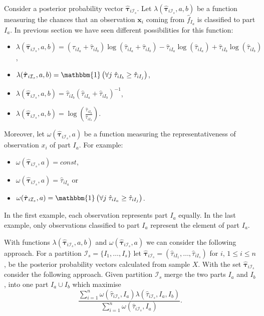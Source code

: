 \documentclass[10pt, a4paper]{article}
\newcommand{\m}[1]{\boldsymbol{#1}}
\begin{document}
Consider a posterior probability vector $\hat{\m \tau}_{i \mathcal{I}_s}$. Let $\lambda(\hat{\m \tau}_{i \mathcal{I}_s}, a, b)$  be a function measuring the chances that an observation $\m x_i$ coming from $\hat{f}_{I_a}$ is classified to part $I_a$. In previous section we have seen different possibilities for this function:
\begin{itemize}
\item $\lambda(\hat{\m \tau}_{i \mathcal{I}_s}, a, b) = (\hat{\tau}_{iI_a}+\hat{\tau}_{iI_b}) \log(\hat{\tau}_{iI_a} + \hat{\tau}_{iI_b}) - \hat{\tau}_{iI_a} \log(\hat{\tau}_{iI_a}) + \hat{\tau}_{iI_b} \log(\hat{\tau}_{iI_b})$,
\item $\lambda(\hat{\m \tau}_{i \mathcal{I}_s}, a, b) =\mathbbm{1}\left( \forall j\; \hat{\tau}_{i I_{b}} \geq \hat{\tau}_{iI_j} \right)$, 
\item $\lambda(\hat{\m \tau}_{i \mathcal{I}_s}, a, b) =\hat{\tau}_{iI_b}(\hat{\tau}_{iI_a} + \hat{\tau}_{iI_b})^{-1}$, 
\item $\lambda(\hat{\m \tau}_{i \mathcal{I}_s}, a, b) =\log( \frac{ \hat{\tau}_{iI_b} }{ \hat{\tau}_{iI_a} })$.
\end{itemize}
Moreover, let $\omega(\hat{\m \tau}_{i \mathcal{I}_s}, a)$ be a function measuring the representativeness of observation $x_i$ of part $I_a$. For example:
\begin{itemize}
\item $\omega(\hat{\m \tau}_{i \mathcal{I}_s}, a) = const$,
\item $\omega(\hat{\m \tau}_{i \mathcal{I}_s}, a) =  \hat{\tau}_{iI_a}$ or
\item $\omega(\hat{\m \tau}_{i \mathcal{I}_s}, a) = \mathbbm{1}\left( \forall j\; \hat{\tau}_{i I_{a}} \geq \hat{\tau}_{iI_j} \right)$.
\end{itemize}
In the first example, each observation represents part $I_a$ equally. In the last example, only observations classified to part $I_a$ represent the element of part $I_a$.

With functions $\lambda(\hat{\m \tau}_{i \mathcal{I}_s}, a, b)$ and $\omega(\hat{\m \tau}_{i \mathcal{I}_s}, a)$ we can consider the following approach. For a partition $\mathcal{I}_s = \{ I_1, \dots, I_s\}$ let $\hat{\m\tau}_{i \mathcal{I}_s} = \left( \hat{\tau}_{i I_1} , \dots, \hat{\tau}_{i I_s}  \right)$ for $i$, $1 \leq i \leq n$, be the posterior probability vectors calculated from sample $X$. With the set $\hat{\m\tau}_{i \mathcal{I}_s}$ consider the following approach. Given partition $\mathcal{I}_s$ merge the two parts $I_a$ and $I_b$, into one part $I_a \cup I_b$ which maximise
\begin{equation}\label{unifying_equation}
\frac{\sum_{i=1}^n \omega(\hat{\tau}_{i \mathcal{I}_s}, I_a) \lambda(\hat{\tau}_{i \mathcal{I}_s}, I_a, I_b)}{\sum_{i=1}^n \omega(\hat{\tau}_{i \mathcal{I}_s}, I_a) }.
\end{equation}
\end{document}
